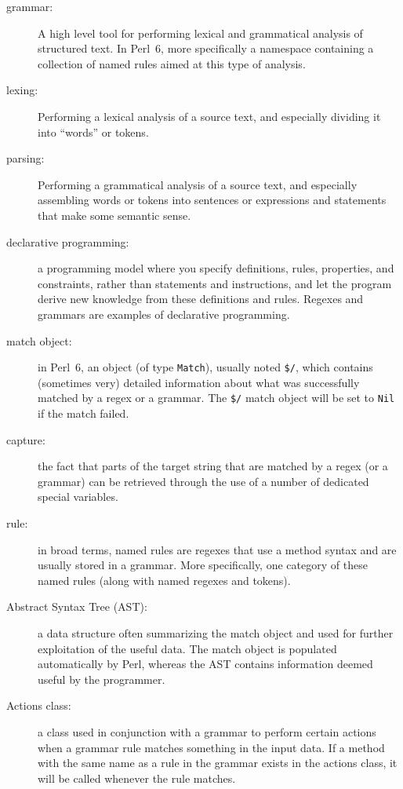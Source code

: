 \begin{description}

\item[grammar:] A high level tool for performing lexical and 
grammatical analysis of structured text. In Perl~6, 
more specifically a namespace containing a collection of 
named rules aimed at this type of analysis.

\item[lexing:] Performing a lexical analysis of a source text, and especially dividing it into ``words'' or tokens.

\item[parsing:] Performing a grammatical analysis of a source text, 
and especially assembling words or tokens into sentences or 
expressions and statements that make some semantic sense. 

\item[declarative programming:] a programming model where you 
specify definitions, rules, properties, and constraints, rather 
than statements and instructions, and let the program derive 
new knowledge from these definitions and rules. Regexes and 
grammars are examples of declarative programming.

\item[match object:] in Perl~6, an object (of type {\tt Match}), 
usually noted \verb'$/', which contains (sometimes very) 
detailed information about what was successfully matched 
by a regex or a grammar. The \verb'$/' match object will be 
set to {\tt Nil} if the match failed.

\item[capture:] the fact that parts of the target string that 
are matched by a regex (or a grammar) can be retrieved through 
the use of a number of dedicated special variables.

\item[rule:] in broad terms, named rules are regexes that use a 
method syntax and are usually stored in a grammar. More specifically, 
one category of these named rules (along with named regexes and 
tokens).

\item[Abstract Syntax Tree (AST):] a data structure often 
summarizing the match object and used for further exploitation 
of the useful data. The match object is populated automatically 
by Perl, whereas the AST contains information deemed useful by 
the programmer.

\item[Actions class:] a class used in conjunction with a grammar 
to perform certain actions when a grammar rule matches 
something in the input data. If a method with the same name 
as a rule in the grammar exists in the actions class, it will 
be called whenever the rule matches.

\end{description}

